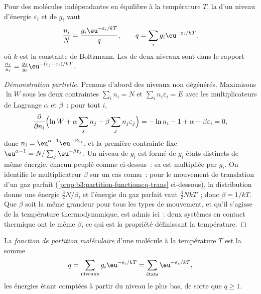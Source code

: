 \begin{theorem}\label{thm:b3:partition-functions:boltzmann}
Pour des molécules indépendantes en équilibre à la température $T$, la
 d'un niveau d'énergie $\varepsilon_i$ et de 
$g_i$ vaut
\[
  \frac{n_i}{N} = \frac{g_i\eu^{-\varepsilon_i/kT}}{q},
  \qquad q = \sum_i g_i\eu^{-\varepsilon_i/kT},
\]
où $k$ est la constante de Boltzmann. Les  de deux niveaux
sont dans le rapport
$\frac{n_j}{n_i} = \frac{g_j}{g_i}\eu^{-(\varepsilon_j - \varepsilon_i)/kT}$.
\end{theorem}

\begin{proof}[Démonstration partielle]
Prenons d'abord des niveaux non dégénérés. Maximisons $\ln W$ sous les
deux contraintes
$\sum_in_i = N$ et $\sum_in_i\varepsilon_i = E$ avec les multiplicateurs
de Lagrange $\alpha$ et $\beta$~:
pour tout $i$,
\[
  \frac{\partial}{\partial n_i}\Bigl(\ln W + \alpha\sum_jn_j - \beta\sum_jn_j\varepsilon_j\Bigr)
  = -\ln n_i - 1 + \alpha - \beta\varepsilon_i = 0,
\]
donc $n_i = \eu^{\alpha - 1}\eu^{-\beta\varepsilon_i}$, et la première contrainte fixe $\eu^{\alpha - 1}
= N/\sum_j\eu^{-\beta\varepsilon_j}$. Un niveau de  $g_i$
est formé de $g_i$ états distincts de même énergie, chacun peuplé comme
ci-dessus~: sa  est multipliée par
$g_i$. On identifie le multiplicateur $\beta$ sur un cas connu~: pour le
mouvement de translation d'un gaz parfait
(\cref{prop:b3:partition-functions:q-trans}
ci-dessous), la distribution donne une énergie $\frac32N/\beta$, et
l'énergie du gaz parfait vaut $\frac32NkT$~; donc $\beta = 1/kT$. Que
$\beta$ soit la même grandeur pour tous les types de mouvement, et qu'il
s'agisse de la température thermodynamique, est admis ici~: deux systèmes
en contact thermique ont le même $\beta$, ce qui est la propriété
définissant la température.
\end{proof}

\begin{definition}\label{def:b3:partition-functions:partition-function}
La \emph{fonction de partition moléculaire} d'une
molécule à la température $T$ est la somme
\[
  q = \sum_{\text{niveaux}}g_i\eu^{-\varepsilon_i/kT} = \sum_{\text{états}}\eu^{-\varepsilon_s/kT},
\]
les énergies étant comptées à partir du niveau le plus bas, de sorte que $q \ge 1$.
\end{definition}

